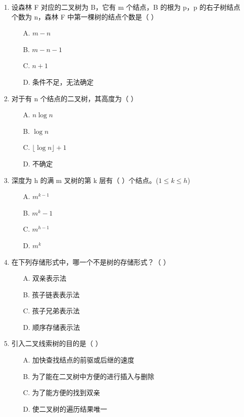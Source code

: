 \documentclass[12pt, a4paper]{article}
\begin{document}
\begin{enumerate}[label=\arabic*.]
	\item 设森林 F 对应的二叉树为 B，它有 m 个结点，B 的根为 p，p 的右子树结点个数为 n，森林 F 中第一棵树的结点个数是（ ）
	      \begin{enumerate}
		      \item[A.] $m-n$
		      \item[B.] $m-n-1$
		      \item[C.] $n+1$
		      \item[D.] 条件不足，无法确定
	      \end{enumerate}

	\item 对于有 n 个结点的二叉树，其高度为（ ）
	      \begin{enumerate}
		      \item[A.] $n \log n$
		      \item[B.] $\log n$
		      \item[C.] $\lfloor \log n \rfloor + 1$
		      \item[D.] 不确定
	      \end{enumerate}

	\item 深度为 h 的满 m 叉树的第 k 层有（ ）个结点。($1 \le k \le h$)
	      \begin{enumerate}
		      \item[A.] $m^{k-1}$
		      \item[B.] $m^k-1$
		      \item[C.] $m^{h-1}$
		      \item[D.] $m^k$
	      \end{enumerate}

	\item 在下列存储形式中，哪一个不是树的存储形式？（ ）
	      \begin{enumerate}
		      \item[A.] 双亲表示法
		      \item[B.] 孩子链表表示法
		      \item[C.] 孩子兄弟表示法
		      \item[D.] 顺序存储表示法
	      \end{enumerate}

	\item 引入二叉线索树的目的是（ ）
	      \begin{enumerate}
		      \item[A.] 加快查找结点的前驱或后继的速度
		      \item[B.] 为了能在二叉树中方便的进行插入与删除
		      \item[C.] 为了能方便的找到双亲
		      \item[D.] 使二叉树的遍历结果唯一
	      \end{enumerate}


\end{enumerate}
\end{document}
